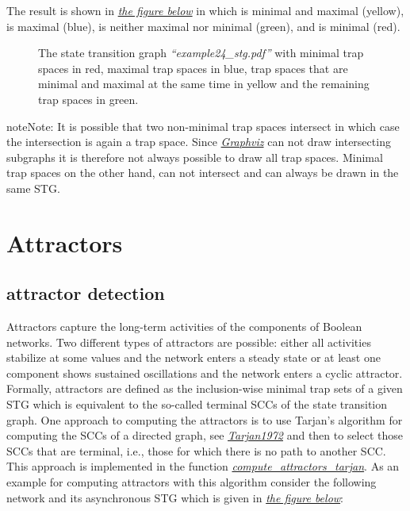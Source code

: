 \documentclass[letterpaper,10pt,english]{sphinxmanual}
\begin{document}
The result is shown in {\hyperref[Manual:figure24]{\emph{the figure below}}} in which  is minimal and maximal (yellow),
 is maximal (blue),  is neither maximal nor minimal (green), and  is minimal (red).
\begin{figure}[htbp]
\centering
\capstart

\caption{The state transition graph \emph{``example24\_stg.pdf''} with minimal trap spaces in red, maximal trap spaces in blue,
trap spaces that are minimal and maximal at the same time in yellow and the remaining trap spaces in green.}\label{Manual:figure24}\end{figure}

\begin{notice}{note}{Note:}
It is possible that two non-minimal trap spaces intersect in which case the intersection is again a trap space.
Since {\hyperref[Installation:installation-graphviz]{\emph{Graphviz}}} can not draw intersecting subgraphs it is therefore not always possible to draw all trap spaces.
Minimal trap spaces on the other hand, can not intersect and can always be drawn in the same STG.
\end{notice}


\section{Attractors}
\label{Manual:attractors}

\subsection{attractor detection}
\label{Manual:attractor-detection}
Attractors capture the long-term activities of the components of Boolean networks.
Two different types of attractors are possible: either all activities stabilize at some values and the network enters a steady state or at least one component shows sustained oscillations and the network enters a cyclic attractor.
Formally, attractors are defined as the inclusion-wise minimal trap sets of a given STG which is equivalent to the so-called terminal SCCs of the state transition graph.
One approach to computing the attractors is to use Tarjan's algorithm for computing the SCCs of a directed graph, see {\hyperref[Bibliography:tarjan1972]{\emph{Tarjan1972}}} and then to select those SCCs that are terminal, i.e., those for which there is no path to another SCC.
This approach is implemented in the function {\hyperref[AttractorDetection:compute-attractors-tarjan]{\emph{compute\_attractors\_tarjan}}}.
As an example for computing attractors with this algorithm consider the following network and its asynchronous STG which is given in {\hyperref[Manual:figure25]{\emph{the figure below}}}:
\end{document}
